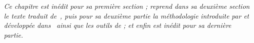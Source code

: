 


\stars


\textit{Ce chapitre est inédit pour sa première section ; reprend dans sa deuxième section le texte traduit de~\cite{raimbault2015models}, puis pour sa deuxième partie la méthodologie introduite par \cite{raimbault2016indirect} et développée dans~\cite{raimbault2017exploration} ainsi que les outils de \cite{bergeaud2017classifying} ; et enfin est inédit pour sa dernière partie.}





